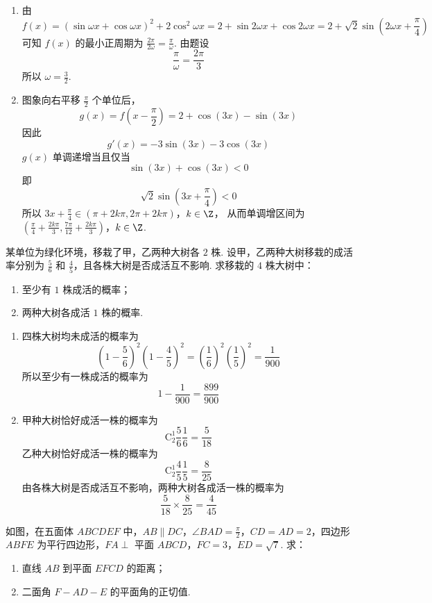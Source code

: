 \begin{solution}
\begin{enumerate}
\item 由
\[
f(x)=(\sin\omega x+\cos\omega x)^2+2\cos^2\omega x
=2+\sin2\omega x+\cos2\omega x
=2+\sqrt2\sin\left(2\omega x+\frac\pi4\right)
\]
可知 \(f(x)\) 的最小正周期为 \(\frac{2\pi}{2\omega}=\frac\pi\omega\). 由题设
\[
\frac\pi\omega=\frac{2\pi}{3}
\]
所以 \(\omega=\frac32\).

\item 图象向右平移 \(\frac\pi2\) 个单位后，
\[
g(x)=f\left(x-\frac\pi2\right)=2+\cos(3x)-\sin(3x)
\]
因此
\[
g'(x)=-3\sin(3x)-3\cos(3x)
\]
\(g(x)\) 单调递增当且仅当
\[
\sin(3x)+\cos(3x)<0
\]
即
\[
\sqrt2\sin\left(3x+\frac\pi4\right)<0
\]
所以
\(3x+\frac\pi4\in\left(\pi+2k\pi,2\pi+2k\pi\right)\)，\(k\in\Z\)，
从而单调增区间为
\(\left(\frac\pi4+\frac{2k\pi}{3},\frac{7\pi}{12}+\frac{2k\pi}{3}\right)\)，\(k\in\Z\).
\end{enumerate}
\end{solution}

\begin{problem}
某单位为绿化环境，移栽了甲，乙两种大树各 \(2\) 株. 设甲，乙两种大树移栽的成活率分别为 \(\frac{5}{6}\) 和 \(\frac{4}{5}\)，且各株大树是否成活互不影响. 求移栽的 \(4\) 株大树中：
\begin{enumerate}
\item 至少有 \(1\) 株成活的概率；
\item 两种大树各成活 \(1\) 株的概率.
\end{enumerate}
\end{problem}

\begin{solution}
\begin{enumerate}
\item 四株大树均未成活的概率为
\[
\left(1-\frac56\right)^2\left(1-\frac45\right)^2
=\left(\frac16\right)^2\left(\frac15\right)^2=\frac1{900}
\]
所以至少有一株成活的概率为
\[
1-\frac1{900}=\frac{899}{900}
\]

\item 甲种大树恰好成活一株的概率为
\[
\mathrm C_2^1\frac56\frac16=\frac5{18}
\]
乙种大树恰好成活一株的概率为
\[
\mathrm C_2^1\frac45\frac15=\frac8{25}
\]
由各株大树是否成活互不影响，两种大树各成活一株的概率为
\[
\frac5{18}\times\frac8{25}=\frac4{45}
\]
\end{enumerate}
\end{solution}

\begin{problem}
如图，在五面体 \(ABCDEF\) 中，\(AB \parallel DC\)，\(\angle BAD = \frac{\pi}{2}\)，\(CD = AD = 2\)，四边形 \(ABFE\) 为平行四边形，\(FA \perp\) 平面 \(ABCD\)，\(FC = 3\)，\(ED = \sqrt{7}\). 求：
\begin{enumerate}
\item 直线 \(AB\) 到平面 \(EFCD\) 的距离；
\item 二面角 \(F - AD - E\) 的平面角的正切值.
\end{enumerate}

\end{problem}

